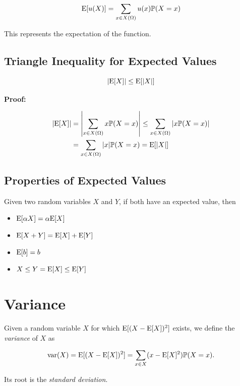 \[
    \mathrm{E}[u(X)] = \sum_{x \in X(\Omega)} u(x)\mathbb{P}(X = x)
\] 

This represents the expectation of the function.

\subsection{Triangle Inequality for  Expected Values}

\[
    |\mathrm{E}[X]| \le \mathrm{E}[|X|]
\]

\textbf{Proof:}

\begin{align*}	
    |\mathrm{E}[X]| &= \left| \sum_{x \in X(\Omega)} x \mathbb{P}(X = x) \right| \le \sum_{x \in X(\Omega)} |x \mathbb{P}(X = x)| \\ 
		    &= \sum_{x \in X(\Omega)} |x| \mathbb{P}(X = x) = \mathrm{E} [|X|]
\end{align*}

\QED

\subsection{Properties of Expected Values}

Given two random variables \(X\) and \(Y\), if both have an expected value, then 

\begin{itemize}
	
    \item \(\mathrm{E}[\alpha X] = \alpha \mathrm{E}[X]\)

    \item \(\mathrm{E}[X + Y] = \mathrm{E}[X] + \mathrm{E}[Y]\)

    \item \(\mathrm{E}[b] = b\)
    
    \item \(X \le Y = \mathrm{E}[X] \le \mathrm{E}[Y]\)

\end{itemize}

\section{Variance}

Given a random variable \(X\) for which \(\mathrm{E}[(X - \mathrm{E}[X])^2]\) exists, we define 
the \emph{variance} of \(X\) as 

\[
    \mathrm{var}(X) = \mathrm{E}[(X - \mathrm{E}[X])^2] = \sum_{x \in X} (x -  \mathrm{E}[X]^2)\mathbb{P}(X = x).
\]

Its root is the \emph{standard deviation}.

